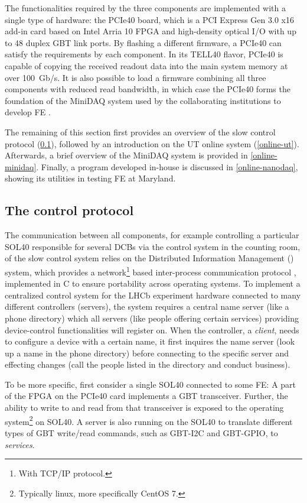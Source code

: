 The functionalities required by the three components are implemented with a
single type of hardware:
the PCIe40 board,
which is a PCI Express Gen 3.0 x16 add-in card based on Intel Arria 10 FPGA and
high-density optical I/O with up to 48 duplex GBT link ports.
By flashing a different firmware,
a PCIe40 can satisfy the requirements by each component.
In its TELL40 flavor, PCIe40 is capable of copying the received readout data
into the main system memory at over 100~Gb/s.
It is also possible to load a firmware combining all three components with
reduced read bandwidth, in which case the PCIe40 forms the foundation of the
MiniDAQ system used by the collaborating institutions to develop FE
\cite{GranadoCardoso:2702137}.

The remaining of this section first provides an overview of
the slow control protocol (\cref{online-dim}),
followed by an introduction on the UT online system (\cref{online-ut}).
Afterwards, a brief overview of the MiniDAQ system is provided in
\cref{online-minidaq}.
Finally, a program developed in-house is discussed in \cref{online-nanodaq},
showing its utilities in testing FE at Maryland.


\subsection{The \dim control protocol}
\label{online-dim}

The communication between all components,
for example controlling a particular SOL40 responsible for several DCBs via
the control system in the counting room,
of the slow control system relies on
the Distributed Information Management (\dim) system,
which provides a network\footnote{
    With TCP/IP protocol.
} based inter-process communication protocol \cite{Gaspar:559279},
implemented in C to ensure portability across operating systems.
To implement a centralized control system for the LHCb experiment hardware
connected to many different controllers (servers),
the \dim system requires a central name server (like a phone directory)
which all \dim servers (like people offering certain services)
providing device-control functionalities will register on.
When the controller, a \dim \emph{client}, needs to configure a device with a
certain name,
it first inquires the name server (look up a name in the phone
directory) before connecting to the specific \dim server and effecting changes
(call the people listed in the directory and conduct business).

To be more specific,
first consider a single SOL40 connected to some FE:
A part of the FPGA on the PCIe40 card implements a GBT transceiver.
Further, the ability to write to and read from that transceiver is exposed
to the operating system\footnote{
    Typically linux, more specifically CentOS 7.
} on SOL40.
A \dim server is also running on the SOL40 to translate different types of GBT
write/read commands,
such as GBT-I2C and GBT-GPIO,
to \dim \emph{services}.

